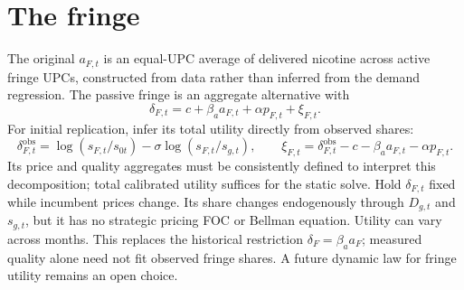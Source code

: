 \documentclass[11pt]{article}
\begin{document}
\section{The fringe}
The original $a_{F,t}$ is an equal-UPC average of delivered nicotine across active fringe UPCs, constructed from data rather than inferred from the demand regression. The passive fringe is an aggregate alternative with
\begin{equation}
\delta_{F,t}=c+\beta_a a_{F,t}+\alpha p_{F,t}+\xi_{F,t}.
\end{equation}
For initial replication, infer its total utility directly from observed shares:
\begin{equation}
\delta_{F,t}^{\mathrm{obs}}=\log(s_{F,t}/s_{0t})-\sigma\log(s_{F,t}/s_{g,t}),\qquad
\xi_{F,t}=\delta_{F,t}^{\mathrm{obs}}-c-\beta_a a_{F,t}-\alpha p_{F,t}.
\end{equation}
Its price and quality aggregates must be consistently defined to interpret this decomposition; total calibrated utility suffices for the static solve. Hold $\delta_{F,t}$ fixed while incumbent prices change. Its share changes endogenously through $D_{g,t}$ and $s_{g,t}$, but it has no strategic pricing FOC or Bellman equation. Utility can vary across months. This replaces the historical restriction $\delta_F=\beta_a a_F$; measured quality alone need not fit observed fringe shares. A future dynamic law for fringe utility remains an open choice.
\end{document}
